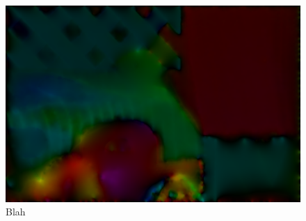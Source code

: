 \documentclass[10pt,twocolumn,letterpaper]{article}
\begin{document}
\begin{figure}[t]
\includegraphics[width=\columnwidth]{10iter.png}
\caption{Blah}
\label{fig:long}
\label{fig:onecol}
\end{figure}

{\small


}
\end{document}
